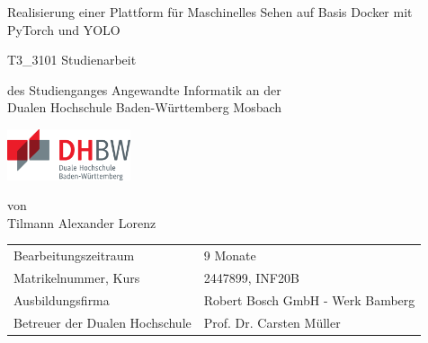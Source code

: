 \def\doctype{T3\_3101 Studienarbeit}
\def\title{Realisierung einer Plattform für Maschinelles Sehen auf Basis Docker mit PyTorch und YOLO}
\def\author{Tilmann Alexander Lorenz}

\begin{titlepage}

    \vspace{10mm}

    \begin{center}
        \vspace{5mm}

        \huge \title

        \vspace{14.2pt}

         \large \doctype


        \vspace{42.6pt}

        \vspace{42.6pt}

        \small des Studienganges Angewandte Informatik an der \\
        \large Dualen Hochschule Baden-Württemberg Mosbach

        \vspace{14.2pt}

        \includegraphics[height=1.5cm]{data/img/logo-dhbw.eps}

        \vspace{42.6pt}

        \small von \\
        \large \author
    \end{center}

    \vspace{98.6pt}

    \begin{table}[h]
        \centering
        \begin{tabular}{ll}
            \small Bearbeitungszeitraum           & 9 Monate                         \\
            \small Matrikelnummer, Kurs           & 2447899, INF20B                  \\
            \small Ausbildungsfirma               & Robert Bosch GmbH - Werk Bamberg \\
            \small Betreuer der Dualen Hochschule & Prof. Dr. Carsten Müller         \\
        \end{tabular}
    \end{table}

    \vspace{49.7pt}


\end{titlepage}